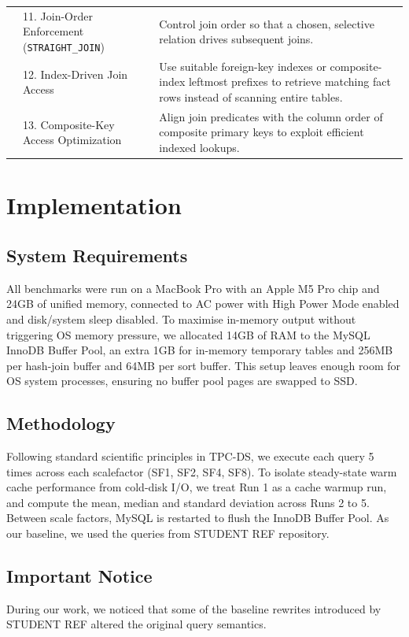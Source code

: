 \documentclass{ULBreport}
\begin{document}
\begin{longtable}{@{}p{}p{}p{}@{}}
 & 11. Join-Order Enforcement (\texttt{STRAIGHT\_JOIN}) & Control join order so that a chosen, selective relation drives subsequent joins. \\
 & 12. Index-Driven Join Access & Use suitable foreign-key indexes or composite-index leftmost prefixes to retrieve matching fact rows instead of scanning entire tables. \\
 & 13. Composite-Key Access Optimization & Align join predicates with the column order of composite primary keys to exploit efficient indexed lookups. \\
\end{longtable}
\endgroup

\chapter{Implementation}

\section{System Requirements}
All benchmarks were run on a MacBook Pro with an Apple M5 Pro chip and 24GB of unified memory, connected to AC power with High Power Mode enabled and disk/system sleep disabled. To maximise in-memory output without triggering OS memory pressure, we allocated 14GB of RAM to the MySQL InnoDB Buffer Pool, an extra 1GB for in-memory temporary tables and 256MB per hash-join buffer and 64MB per sort buffer. This setup leaves enough room for OS system processes, ensuring no buffer pool pages are swapped to SSD.

\section{Methodology}
\label{sec:methodology}
Following standard scientific principles in TPC-DS, we execute each query 5 times across each scalefactor (SF1, SF2, SF4, SF8). To isolate steady-state warm cache performance from cold-disk I/O, we treat Run 1 as a cache warmup run, and compute the mean, median and standard deviation across Runs 2 to 5. Between scale factors, MySQL is restarted to flush the InnoDB Buffer Pool. As our baseline, we used the queries from STUDENT REF repository.

\section{Important Notice}
\label{sec:important_notice}
During our work, we noticed that some of the baseline rewrites introduced by STUDENT REF altered the original query semantics.
\end{document}
